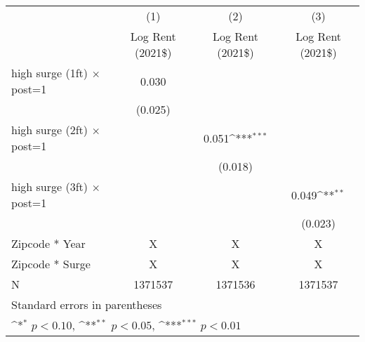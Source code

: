 {
\def\sym#1{\ifmmode^{#1}\else\(^{#1}\)\fi}
\begin{tabular}{l*{3}{c}}
\toprule
                    &\multicolumn{1}{c}{(1)}&\multicolumn{1}{c}{(2)}&\multicolumn{1}{c}{(3)}\\
                    &\multicolumn{1}{c}{Log Rent (2021\$)}&\multicolumn{1}{c}{Log Rent (2021\$)}&\multicolumn{1}{c}{Log Rent (2021\$)}\\
\midrule
high surge (\>1ft) $\times$ post=1&       0.030         &                     &                     \\
                    &     (0.025)         &                     &                     \\
\addlinespace
high surge (\>2ft) $\times$ post=1&                     &       0.051\sym{***}  &                     \\
                    &                     &     (0.018)         &                     \\
\addlinespace
high surge (\>3ft) $\times$ post=1&                     &                     &       0.049\sym{**}         \\
                    &                     &                     &     (0.023)         \\
\midrule
Zipcode * Year      &          X           &         X            &        X             \\
Zipcode * Surge     &           X          &          X           &         X            \\
N                   &     1371537         &     1371536         &     1371537         \\
\bottomrule
\multicolumn{4}{l}{\footnotesize Standard errors in parentheses}\\
\multicolumn{4}{l}{\footnotesize \sym{*} \(p<0.10\), \sym{**} \(p<0.05\), \sym{***} \(p<0.01\)}\\
\end{tabular}
}
